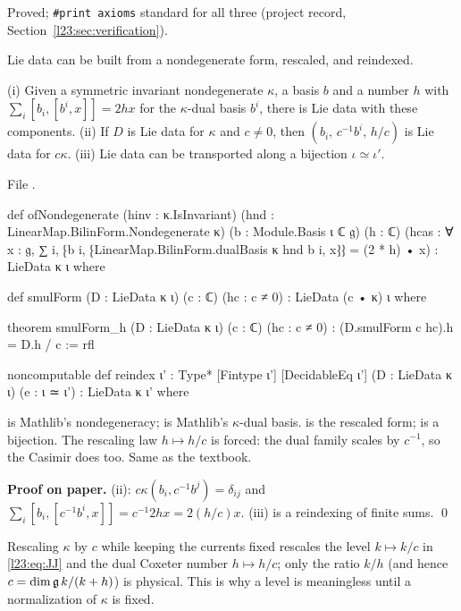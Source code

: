 \begin{status}
Proved; \texttt{\#print axioms} standard for all three (project record, Section~\ref{l23:sec:verification}).
\end{status}

Lie data can be built from a nondegenerate form, rescaled, and reindexed.

\begin{definition}\label{l23:def:smulform}
(i) Given a symmetric invariant nondegenerate $\kappa$, a basis $b$ and a number $h$ with
$\sum_i[b_i,[b^i,x]]=2hx$ for the $\kappa$-dual basis $b^i$, there is Lie data with these components.
(ii) If $D$ is Lie data for $\kappa$ and $c\ne0$, then $(b_i,\,c^{-1}b^i,\,h/c)$ is Lie data for $c\kappa$.
(iii) Lie data can be transported along a bijection $\iota\simeq\iota'$.
\end{definition}
\noindent File .
\begin{leancode}
def ofNondegenerate (hinv : κ.IsInvariant) (hnd : LinearMap.BilinForm.Nondegenerate κ) (b : Module.Basis ι ℂ 𝔤)
    (h : ℂ) (hcas : ∀ x : 𝔤, ∑ i, ⁅b i, ⁅LinearMap.BilinForm.dualBasis κ hnd b i, x⁆⁆ = (2 * h) • x) :
    LieData κ ι where

def smulForm (D : LieData κ ι) (c : ℂ) (hc : c ≠ 0) : LieData (c • κ) ι where

theorem smulForm_h (D : LieData κ ι) (c : ℂ) (hc : c ≠ 0) : (D.smulForm c hc).h = D.h / c := rfl

noncomputable def reindex {ι' : Type*} [Fintype ι'] [DecidableEq ι'] (D : LieData κ ι) (e : ι ≃ ι') :
    LieData κ ι' where
\end{leancode}

\begin{dictionary}
 is Mathlib's nondegeneracy;  is Mathlib's
$\kappa$-dual basis.  is the rescaled form;  is a bijection. The rescaling law $h\mapsto h/c$
is forced: the dual family scales by $c^{-1}$, so the Casimir does too. Same as the textbook.
\end{dictionary}

\textbf{Proof on paper.} (ii): $c\kappa(b_i,c^{-1}b^j)=\delta_{ij}$ and $\sum_i[b_i,[c^{-1}b^i,x]]=c^{-1}2hx=2(h/c)x$.
(iii) is a reindexing of finite sums. \qed

\begin{physics}
Rescaling $\kappa$ by $c$ while keeping the currents fixed rescales the level $k\mapsto k/c$ in \eqref{l23:eq:JJ} and
the dual Coxeter number $h\mapsto h/c$; only the ratio $k/h$ (and hence $c=\dim\mathfrak g\,k/(k+h)$) is physical. This is
why a level is meaningless until a normalization of $\kappa$ is fixed.
\end{physics}

